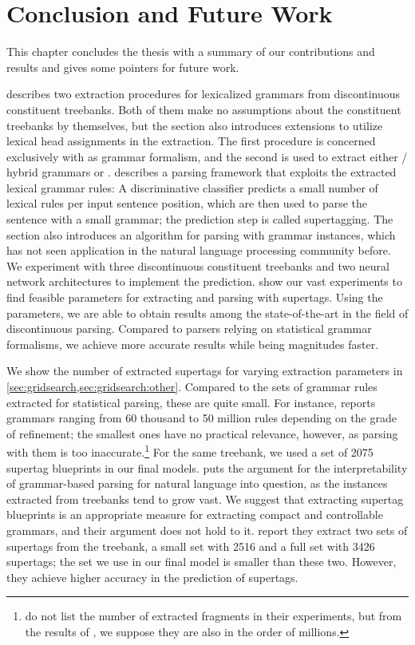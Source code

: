 \documentclass[../document.tex]{subfiles}
\begin{document}
    \chapter{Conclusion and Future Work}\label{chp:conclusion}
    This chapter concludes the thesis with a summary of our contributions and results and gives some pointers for future work.

     describes two extraction procedures for lexicalized grammars from discontinuous constituent treebanks.
    Both of them make no assumptions about the constituent treebanks by themselves, but the section also introduces extensions to utilize lexical head assignments in the extraction.
    The first procedure is concerned exclusively with  as grammar formalism, and the second is used to extract either / hybrid grammars or .
     describes a parsing framework that exploits the extracted lexical grammar rules:
        A discriminative classifier predicts a small number of lexical rules per input sentence position, which are then used to parse the sentence with a small grammar; the prediction step is called supertagging.
    The section also introduces an algorithm for parsing with  grammar instances, which has not seen application in the natural language processing community before.
    We experiment with three discontinuous constituent treebanks and two neural network architectures to implement the prediction.
     show our vast experiments to find feasible parameters for extracting and parsing with supertags.
    Using the parameters, we are able to obtain results among the state-of-the-art in the field of discontinuous parsing.
    Compared to parsers relying on statistical grammar formalisms, we achieve more accurate results while being magnitudes faster.

    We show the number of extracted supertags for varying extraction parameters in \cref{sec:gridsearch,sec:gridsearch:other}.
    Compared to the sets of grammar rules extracted for statistical parsing, these are quite small.
    For instance, \citet[in Figure~7.4]{Geb20} reports grammars ranging from 60 thousand to 50 million rules depending on the grade of refinement; the smallest ones have no practical relevance, however, as parsing with them is too inaccurate.\footnote{
         do not list the number of extracted fragments in their experiments, but from the results of \citet{San11}, we suppose they are also in the order of millions.
    }
    For the same treebank, we used a set of 2075 supertag blueprints in our final models.
     puts the argument for the interpretability of grammar-based parsing for natural language into question, as the instances extracted from treebanks tend to grow vast.
    We suggest that extracting supertag blueprints is an appropriate measure for extracting compact and controllable grammars, and their argument does not hold to it.
     report they extract two sets of  supertags from the treebank, a small set with 2516 and a full set with 3426 supertags; the set we use in our final model is smaller than these two.
    However, they achieve higher accuracy in the prediction of supertags.
\end{document}
